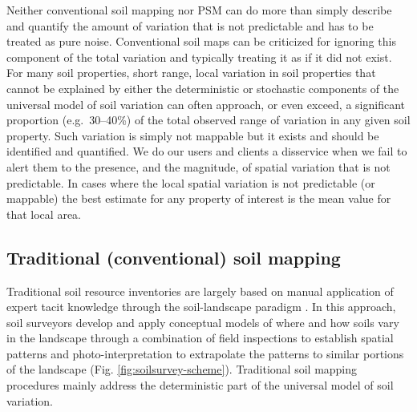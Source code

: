 \documentclass[11pt]{krantz}
\theoremstyle{definition}
\theoremstyle{definition}
\theoremstyle{definition}
\theoremstyle{remark}
\begin{document}
Neither conventional soil mapping nor PSM can do more than simply
describe and quantify the amount of variation that is not predictable
and has to be treated as pure noise. Conventional soil maps can be
criticized for ignoring this component of the total variation and
typically treating it as if it did not exist. For many soil properties,
short range, local variation in soil properties that cannot be explained
by either the deterministic or stochastic components of the universal
model of soil variation can often approach, or even exceed, a
significant proportion (e.g.~30--40\%) of the total observed range of
variation in any given soil property. Such variation is simply not
mappable but it exists and should be identified and quantified. We do
our users and clients a disservice when we fail to alert them to the
presence, and the magnitude, of spatial variation that is not
predictable. In cases where the local spatial variation is not
predictable (or mappable) the best estimate for any property of interest
is the mean value for that local area.

\hypertarget{conventional-mapping}{%
\subsection{Traditional (conventional) soil
mapping}\label{conventional-mapping}}

Traditional soil resource inventories are largely based on manual
application of expert tacit knowledge through the soil-landscape
paradigm \citep{Burrough1971, Hudson2000SSSAJ}. In this approach, soil
surveyors develop and apply conceptual models of where and how soils
vary in the landscape through a combination of field inspections to
establish spatial patterns and photo-interpretation to extrapolate the
patterns to similar portions of the landscape (Fig.
\ref{fig:soilsurvey-scheme}). Traditional soil mapping procedures mainly
address the deterministic part of the universal model of soil variation.
\end{document}
